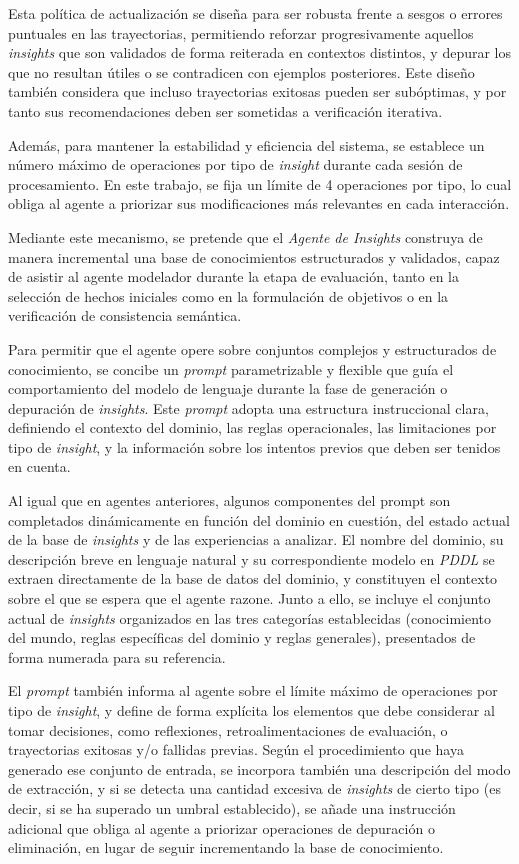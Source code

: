 Esta política de actualización se diseña para ser robusta frente a sesgos o errores puntuales en las trayectorias, permitiendo reforzar progresivamente aquellos \textit{insights} que son validados de forma reiterada en contextos distintos, y depurar los que no resultan útiles o se contradicen con ejemplos posteriores. Este diseño también considera que incluso trayectorias exitosas pueden ser subóptimas, y por tanto sus recomendaciones deben ser sometidas a verificación iterativa.

Además, para mantener la estabilidad y eficiencia del sistema, se establece un número máximo de operaciones por tipo de \textit{insight} durante cada sesión de procesamiento. En este trabajo, se fija un límite de 4 operaciones por tipo, lo cual obliga al agente a priorizar sus modificaciones más relevantes en cada interacción.

Mediante este mecanismo, se pretende que el \textit{Agente de Insights} construya de manera incremental una base de conocimientos estructurados y validados, capaz de asistir al agente modelador durante la etapa de evaluación, tanto en la selección de hechos iniciales como en la formulación de objetivos o en la verificación de consistencia semántica.

Para permitir que el agente opere sobre conjuntos complejos y estructurados de conocimiento, se concibe un \textit{prompt} parametrizable y flexible que guía el comportamiento del modelo de lenguaje durante la fase de generación o depuración de \textit{insights}. Este \textit{prompt} adopta una estructura instruccional clara, definiendo el contexto del dominio, las reglas operacionales, las limitaciones por tipo de \textit{insight}, y la información sobre los intentos previos que deben ser tenidos en cuenta.

Al igual que en agentes anteriores, algunos componentes del prompt son completados dinámicamente en función del dominio en cuestión, del estado actual de la base de \textit{insights} y de las experiencias a analizar. El nombre del dominio, su descripción breve en lenguaje natural y su correspondiente modelo en \textit{PDDL} se extraen directamente de la base de datos del dominio, y constituyen el contexto sobre el que se espera que el agente razone. Junto a ello, se incluye el conjunto actual de \textit{insights} organizados en las tres categorías establecidas (conocimiento del mundo, reglas específicas del dominio y reglas generales), presentados de forma numerada para su referencia.

El \textit{prompt} también informa al agente sobre el límite máximo de operaciones por tipo de \textit{insight}, y define de forma explícita los elementos que debe considerar al tomar decisiones, como reflexiones, retroalimentaciones de evaluación, o trayectorias exitosas y/o fallidas previas. Según el procedimiento que haya generado ese conjunto de entrada, se incorpora también una descripción del modo de extracción, y si se detecta una cantidad excesiva de \textit{insights} de cierto tipo (es decir, si se ha superado un umbral establecido), se añade una instrucción adicional que obliga al agente a priorizar operaciones de depuración o eliminación, en lugar de seguir incrementando la base de conocimiento.

